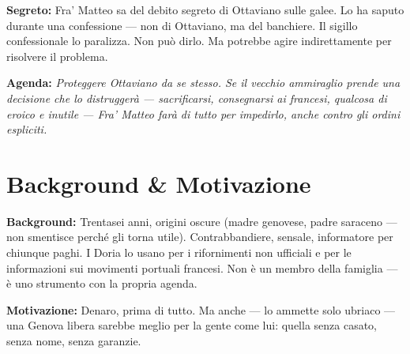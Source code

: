 \clearpage

\begin{secretbox}
  \textbf{Segreto:} Fra' Matteo sa del debito segreto di Ottaviano sulle galee. Lo ha
  saputo durante una confessione — non di Ottaviano, ma del banchiere. Il sigillo
  confessionale lo paralizza. Non può dirlo. Ma potrebbe agire indirettamente per
  risolvere il problema.

  \medskip\noindent\textcolor{SecretRed}{\textbf{Agenda:}}
  \textit{Proteggere Ottaviano da se stesso. Se il vecchio ammiraglio prende una
  decisione che lo distruggerà — sacrificarsi, consegnarsi ai francesi, qualcosa di
  eroico e inutile — Fra' Matteo farà di tutto per impedirlo, anche contro gli ordini
  espliciti.}
\end{secretbox}

\clearpage



\section*{Background \& Motivazione}
\begin{rulebox}{}
  \textbf{Background:} Trentasei anni, origini oscure (madre genovese, padre saraceno —
  non smentisce perché gli torna utile). Contrabbandiere, sensale, informatore per
  chiunque paghi. I Doria lo usano per i rifornimenti non ufficiali e per le
  informazioni sui movimenti portuali francesi. Non è un membro della famiglia —
  è uno strumento con la propria agenda.

  \medskip\noindent\textcolor{DoriaBlue}{\textbf{Motivazione:}} Denaro, prima di tutto.
  Ma anche — lo ammette solo ubriaco — una Genova libera sarebbe meglio per la gente
  come lui: quella senza casato, senza nome, senza garanzie.
\end{rulebox}

